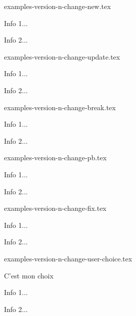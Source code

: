 \begin{filecontents*}[overwrite]{examples-version-n-change-new.tex}
\begin{tdocnew}
    \item Info 1...
    \item Info 2...
\end{tdocnew}
\end{filecontents*}


\begin{filecontents*}[overwrite]{examples-version-n-change-update.tex}
\begin{tdocupdate}
    \item Info 1...
    \item Info 2...
\end{tdocupdate}
\end{filecontents*}


\begin{filecontents*}[overwrite]{examples-version-n-change-break.tex}
\begin{tdocbreak}
    \item Info 1...
    \item Info 2...
\end{tdocbreak}
\end{filecontents*}


\begin{filecontents*}[overwrite]{examples-version-n-change-pb.tex}
\begin{tdocprob}
    \item Info 1...
    \item Info 2...
\end{tdocprob}
\end{filecontents*}


\begin{filecontents*}[overwrite]{examples-version-n-change-fix.tex}
\begin{tdocfix}
    \item Info 1...
    \item Info 2...
\end{tdocfix}
\end{filecontents*}


\begin{filecontents*}[overwrite]{examples-version-n-change-user-choice.tex}
\begin{tdoctopic}{C'est mon choix}
    \item Info 1...
    \item Info 2...
\end{tdoctopic}
\end{filecontents*}


